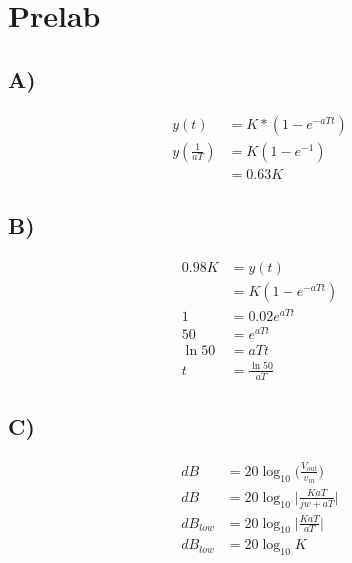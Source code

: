 \documentclass{report}
\begin{document}

\section*{Prelab} %
\label{sec:pre_lab}

\subsection*{A)} %
\label{sub:a_}
\begin{align*}
    y(t) &= K * (1 -e^{-aTt})\\
    y(\frac{1}{aT}) &= K(1 -e^{-1})\\
        &= 0.63K
\end{align*}

\subsection*{B)} %
\label{sub:b_}
\begin{align*}
    0.98K &= y(t)\\
        &= K(1 - e^{-aTt})\\
    1 &= 0.02e^{aTt}\\
    50 &= e^{aTt}\\
    \ln50 &= aTt\\
    t &= \frac{\ln50}{aT}
\end{align*}

\subsection*{C)} %
\label{sub:c_}
\begin{align*}
    dB &= 20\log_{10}\bigg(\frac{V_{out}}{v_{in}}\bigg)\\
    dB &= 20\log_{10}\bigg|\frac{KaT}{jw + aT}\bigg|\\
    dB_{low} &= 20\log_{10}\bigg|\frac{KaT}{aT}\bigg|\\
    dB_{low} &= 20\log_{10}K
\end{align*}
\end{document}
